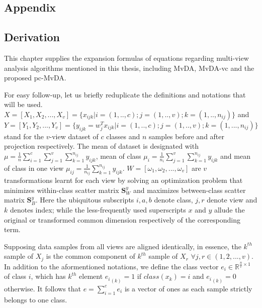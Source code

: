 
\cleardoublepage
{}
\ohead[]{\pagemark}
\begin{appendix}
\chapter{Appendix} \label{chap:appendix}

\section{Derivation} \label{app:derivation}

This chapter supplies the expansion formulas of equations regarding multi-view analysis algorithms mentioned in this thesis, including MvDA, MvDA-vc and the proposed pc-MvDA.

For easy follow-up, let us briefly reduplicate the definitions and notations that will be used.
$X = \left[X_1, X_2, ..., X_v\right] = \{x_{ijk}|i=(1,..,c);j = (1,..,v);k=(1,..,n_{ij})\}$ and $Y = \left[Y_1, Y_2, ..., Y_v\right] = \{y_{ijk} = w_j^T x_{ijk}|i=(1,..,c); j=(1,..,v); k=(1,...,n_{ij})\}$ stand for the $v$-view dataset of $c$ classes and $n$ samples before and after projection respectively.
The mean of dataset is designated with $\mu = \frac{1}{n}\sum_{i=1}^{c}\sum_{j=1}^{v}\sum_{k=1}^{n_{ij}}y_{ijk}$, mean of class $\mu_{i} = \frac{1}{n_i}\sum_{j=1}^{v}\sum_{k=1}^{n_{ij}}y_{ijk}$ and mean of class in one view $\mu_{ij} = \frac{1}{n_{ij}}\sum_{k=1}^{n_{ij}}y_{ijk}$.
$W = \left[\omega_1, \omega_2, ..., \omega_v\right]$ are $v$ transformations learnt for each view by solving an optimization problem that minimizes within-class scatter matrix $\boldsymbol{S}^y_W$ and maximizes between-class scatter matrix $\boldsymbol{S}^y_B$.
Here the ubiquitous subscripts $i, a, b$ denote class, $j, r$ denote view and $k$ denotes index; while the less-frequently used superscripts $x$ and $y$ allude the original or transformed common dimension respectively of the corresponding term.

Supposing data samples from all views are aligned identically, in essence, the $k^{th}$ sample of $X_j$ is the common component of $k^{th}$ sample of $X_r$ $\forall j, r \in (1, 2, ..., v)$.
In addition to the aformentioned notations, we define the class vector $e_i \in \mathbb{R}^{\frac{n}{v}\times 1}$ of class $i$, which has $k^{th}$ element ${e_i}_{(k)} = 1$ if $class(x_k) = i$ and ${e_i}_{(k)} = 0$ otherwise.
It follows that $e = \sum_{i=1}^{c}e_i$ is a vector of ones as each sample strictly belongs to one class.


\end{appendix}
